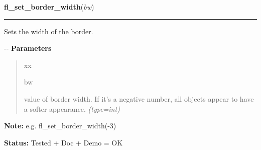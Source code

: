 \hspace{.8\funcindent}\begin{boxedminipage}{\funcwidth}

    \raggedright \textbf{fl\_set\_border\_width}(\textit{bw})

    \vspace{-1.5ex}

    \rule{\textwidth}{0.5\fboxrule}
\setlength{\parskip}{2ex}

Sets the width of the border.

-{}-
\setlength{\parskip}{1ex}
      \textbf{Parameters}
      \vspace{-1ex}

      \begin{quote}
        \begin{Ventry}{xx}

          \item[bw]


value of border width. If it's a negative number, all objects appear
to have a softer appearance.
            {\it (type=int)}

        \end{Ventry}

      \end{quote}

\textbf{Note:} 
e.g. fl\_set\_border\_width(-3)


\textbf{Status:} 
Tested + Doc + Demo = OK


    \end{boxedminipage}

    \label{xformslib:flbasic:fl_set_scrollbar_type}

    \vspace{0.5ex}

